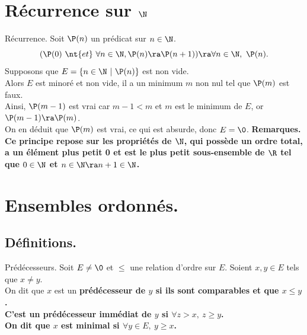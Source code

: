 \documentclass[french, 11pt]{article}
\begin{document}


\section{Récurrence sur \texorpdfstring{$\N$}{Lg}}

\begin{prop}{Récurrence.}{}
    Soit $\P(n)$ un prédicat sur $n\in\N$.
    \begin{equation*}
        (\P(0) ~ \nt{et} ~ \forall n\in\N, \P(n) \ra \P(n+1)) \ra \forall n\in\N, ~ \P(n).
    \end{equation*}
    \tcblower
    Supposons que $E=\{n\in\N ~ | ~ \P(n)\}$ est non vide.\\
    Alors $E$ est minoré et non vide, il a un minimum $m$ non nul tel que $\P(m)$ est faux.\\
    Ainsi, $\P(m-1)$ est vrai car $m-1<m$ et $m$ est le minimum de $E$, or $\P(m-1)\ra \P(m)$.\\
    On en déduit que $\P(m)$ est vrai, ce qui est absurde, donc $E=\0$.\n
    \bf{Remarques.} Ce principe repose sur les propriétés de $\N$, qui possède un ordre total, a un élément plus petit 0 et est le plus petit sous-ensemble de $\R$ tel que $0\in\N$ et $n\in\N\ra n+1\in\N$.
\end{prop}

\vspace*{-0.4cm}

\section{Ensembles ordonnés.}
\subsection{Définitions.}

\begin{defi}{Prédécesseurs.}{}
    Soit $E\neq\0$ et $\leq$ une relation d'ordre sur $E$. Soient $x,y\in E$ tels que $x\neq y$.\\
    On dit que $x$ est un \bf{prédécesseur} de $y$ si ils sont comparables et que $x\leq y$.\\
    C'est un \bf{prédécesseur immédiat} de $y$ si $\forall z>x, ~ z\geq y$.\\
    On dit que $x$ est \bf{minimal} si $\forall y \in E, ~ y \geq x$.
\end{defi}

\vspace*{-0.4cm}
\end{document}
